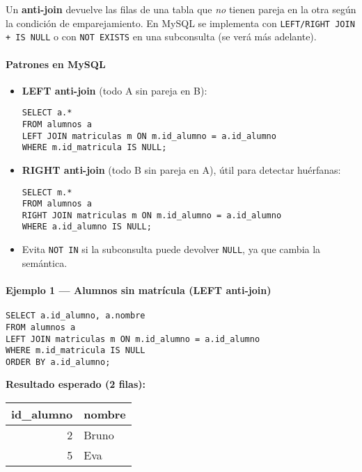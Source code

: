 \documentclass[11pt,a4paper]{article}
\begin{document}
\begin{tcolorbox}[title=Idea]
Un \textbf{anti-join} devuelve las filas de una tabla que \emph{no} tienen pareja en la otra según la condición de emparejamiento. En MySQL se implementa con \texttt{LEFT/RIGHT JOIN + IS NULL} o con \texttt{NOT EXISTS} en una subconsulta (se verá más adelante).
\end{tcolorbox}

\paragraph{Patrones en MySQL}
\begin{itemize}[leftmargin=1.2em]
  \item \textbf{LEFT anti-join} (todo A sin pareja en B):
\begin{lstlisting}
SELECT a.*
FROM alumnos a
LEFT JOIN matriculas m ON m.id_alumno = a.id_alumno
WHERE m.id_matricula IS NULL;
\end{lstlisting}

  \item \textbf{RIGHT anti-join} (todo B sin pareja en A), útil para detectar huérfanas:
\begin{lstlisting}
SELECT m.*
FROM alumnos a
RIGHT JOIN matriculas m ON m.id_alumno = a.id_alumno
WHERE a.id_alumno IS NULL;
\end{lstlisting}

  \item Evita \texttt{NOT IN} si la subconsulta puede devolver \texttt{NULL}, ya que cambia la semántica.
\end{itemize}

\paragraph{Ejemplo 1 — Alumnos sin matrícula (LEFT anti-join)}
\begin{lstlisting}
SELECT a.id_alumno, a.nombre
FROM alumnos a
LEFT JOIN matriculas m ON m.id_alumno = a.id_alumno
WHERE m.id_matricula IS NULL
ORDER BY a.id_alumno;
\end{lstlisting}

\textbf{Resultado esperado (2 filas):}
\begin{center}
\begin{tabular}{r l}
\toprule
id\_alumno & nombre \\
\midrule
2 & Bruno \\
5 & Eva \\
\bottomrule
\end{tabular}
\end{center}
\end{document}
